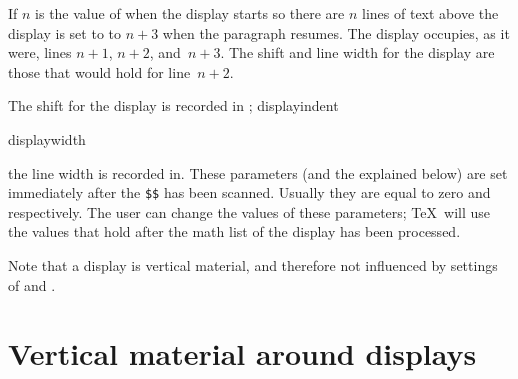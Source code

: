 If $n$ is the value of  when the display starts
\ldash so there are $n$ lines of text above the display \rdash 
{} is set to to $n+3$ when the paragraph resumes.
The display occupies, as it were, lines $n+1$, $n+2$, and~$n+3$.
The shift and line width for the display are those
that would hold for line~$n+2$.

The shift for the display is recorded in ;
\cstoidx displayindent\par\cstoidx displaywidth\par
the line width is recorded in\handbreak {}. These parameters
(and the  explained below)
are set immediately after the \verb>$$> has been scanned.
Usually they are equal to zero and  respectively.
The user can change the values of these parameters; 
\TeX\ will use the
values that hold after the math list 
of the display has been processed.

Note that a display is vertical material, and therefore
not influenced by settings of  and .

\section{Vertical material around displays}

